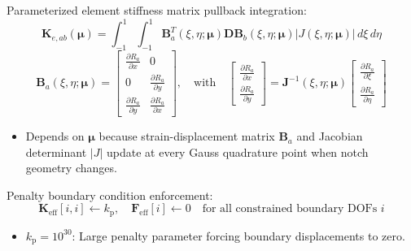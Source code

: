 \documentclass[12pt,a4paper,oneside]{report}
\newcommand{\vect}[1]{\mathbf{#1}}
\newcommand{\mat}[1]{\mathbf{#1}}
\begin{document}
Parameterized element stiffness matrix pullback integration:
\begin{equation}
    \mat{K}_{e, ab}(\boldsymbol{\mu}) = \int_{-1}^{1} \int_{-1}^{1} \mat{B}_a^T(\xi, \eta; \boldsymbol{\mu}) \mat{D} \mat{B}_b(\xi, \eta; \boldsymbol{\mu}) |J(\xi, \eta; \boldsymbol{\mu})| \, d\xi \, d\eta
\end{equation}
\begin{equation}
    \mat{B}_a(\xi, \eta; \boldsymbol{\mu}) = \begin{bmatrix} \frac{\partial R_a}{\partial x} & 0 \\[0.3em] 0 & \frac{\partial R_a}{\partial y} \\[0.3em] \frac{\partial R_a}{\partial y} & \frac{\partial R_a}{\partial x} \end{bmatrix}, \quad \text{with} \quad \begin{bmatrix} \frac{\partial R_a}{\partial x} \\[0.3em] \frac{\partial R_a}{\partial y} \end{bmatrix} = \mat{J}^{-1}(\xi, \eta; \boldsymbol{\mu}) \begin{bmatrix} \frac{\partial R_a}{\partial \xi} \\[0.3em] \frac{\partial R_a}{\partial \eta} \end{bmatrix}
\end{equation}
\begin{tcolorbox}[colback=gray!5!white,colframe=gray!60!black,title={Term Definitions \& Parameter Dependencies}]
\begin{itemize}
    \item Depends on $\boldsymbol{\mu}$ because strain-displacement matrix $\mat{B}_a$ and Jacobian determinant $|J|$ update at every Gauss quadrature point when notch geometry changes.
\end{itemize}
\end{tcolorbox}

Penalty boundary condition enforcement:
\begin{equation}
    \mat{K}_{\text{eff}}[i, i] \gets k_{\text{p}}, \quad \vect{F}_{\text{eff}}[i] \gets 0 \quad \text{for all constrained boundary DOFs } i
\end{equation}
\begin{tcolorbox}[colback=gray!5!white,colframe=gray!60!black,title={Term Definitions \& Parameter Dependencies}]
\begin{itemize}
    \item $k_{\text{p}} = 10^{30}$: Large penalty parameter forcing boundary displacements to zero.
\end{itemize}
\end{tcolorbox}
\end{document}
